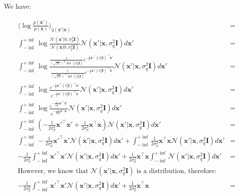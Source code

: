 \documentclass[11pt,a4paper,oneside]{report}
\begin{document}
We have:

\begin{align*}
\langle\log \frac{p(\mathbf{x}')}{p(\mathbf{x})}\rangle_{\tilde{q}(\mathbf{x}'|\mathbf{x})}&=\\
\int_{-\inf}^{+\inf} \log \frac{\mathcal{N}(\mathbf{x}'|0,\sigma_p^2\mathbf{I})}{\mathcal{N}(\mathbf{x}|0,\sigma_p^2\mathbf{I})}\mathcal{N}(\mathbf{x}'|\mathbf{x},\sigma_q^2\mathbf{I})d\mathbf{x}'&=\\
\int_{-\inf}^{+\inf} \log \frac{\frac{1}{(\sqrt{2\pi})^N\det(\sigma_p^2\mathbf{I})}e^{-\frac{1}{2}\mathbf{x'}^\top(\sigma_p^2\mathbf{I})^{-1}\mathbf{x'}}}{\frac{1}{(\sqrt{2\pi})^N\det(\sigma_p^2\mathbf{I})}e^{-\frac{1}{2}\mathbf{x}^\top(\sigma_p^2\mathbf{I})^{-1}\mathbf{x}}}\mathcal{N}(\mathbf{x}'|\mathbf{x},\sigma_q^2\mathbf{I})d\mathbf{x}'&=\\
\int_{-\inf}^{+\inf} \log \frac{e^{-\frac{1}{2}\mathbf{x'}^\top(\sigma_p^2\mathbf{I})^{-1}\mathbf{x'}}}{e^{-\frac{1}{2}\mathbf{x}^\top(\sigma_p^2\mathbf{I})^{-1}\mathbf{x}}}\mathcal{N}(\mathbf{x}'|\mathbf{x},\sigma_q^2\mathbf{I})d\mathbf{x}'&=\\
\int_{-\inf}^{+\inf} \log \frac{e^{-\frac{1}{2\sigma_p^2}\mathbf{x'}^\top\mathbf{x'}}}{e^{-\frac{1}{2\sigma_p^2}\mathbf{x}^\top\mathbf{x}}}\mathcal{N}(\mathbf{x}'|\mathbf{x},\sigma_q^2\mathbf{I})d\mathbf{x}'&=\\
\int_{-\inf}^{+\inf} \left(-\frac{1}{2\sigma_p^2}\mathbf{x'}^\top\mathbf{x'}+\frac{1}{2\sigma_p^2}\mathbf{x}^\top\mathbf{x}\right)\mathcal{N}(\mathbf{x}'|\mathbf{x},\sigma_q^2\mathbf{I})d\mathbf{x}'&=\\
\int_{-\inf}^{+\inf} -\frac{1}{2\sigma_p^2}\mathbf{x'}^\top\mathbf{x'}\mathcal{N}(\mathbf{x}'|\mathbf{x},\sigma_q^2\mathbf{I})d\mathbf{x}' + \int_{-\inf}^{+\inf}\frac{1}{2\sigma_p^2}\mathbf{x}^\top\mathbf{x} \mathcal{N}(\mathbf{x}'|\mathbf{x},\sigma_q^2\mathbf{I})d\mathbf{x}'&=\\
-\frac{1}{2\sigma_p^2}\int_{-\inf}^{+\inf} \mathbf{x'}^\top\mathbf{x'}\mathcal{N}(\mathbf{x}'|\mathbf{x},\sigma_q^2\mathbf{I})d\mathbf{x}' + \frac{1}{2\sigma_p^2}\mathbf{x}^\top\mathbf{x} \int_{-\inf}^{+\inf} \mathcal{N}(\mathbf{x}'|\mathbf{x},\sigma_q^2\mathbf{I})d\mathbf{x}'&=\\
\text{However, we know that }\mathcal{N}(\mathbf{x}'|\mathbf{x},\sigma_q^2\mathbf{I})\text{ is a distribution, therefore}:&\\
-\frac{1}{2\sigma_p^2}\int_{-\inf}^{+\inf} \mathbf{x'}^\top\mathbf{x'}\mathcal{N}(\mathbf{x}'|\mathbf{x},\sigma_q^2\mathbf{I})d\mathbf{x}' + \frac{1}{2\sigma_p^2}\mathbf{x}^\top\mathbf{x} &=\\

\end{align*}
\end{document}

